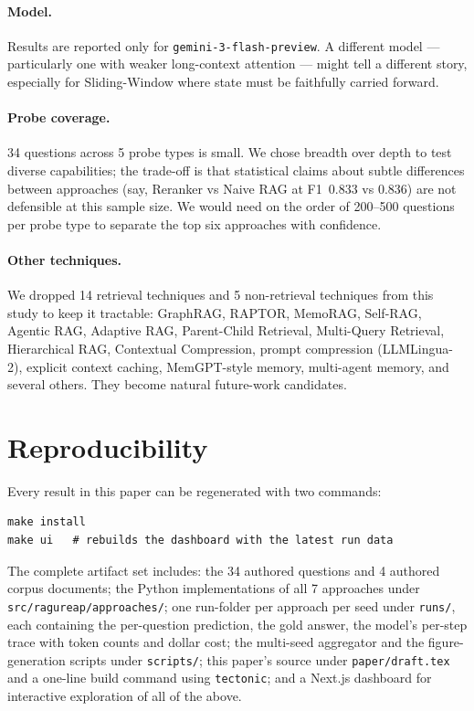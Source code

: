 \documentclass[11pt,a4paper]{article}
\begin{document}
\paragraph{Model.} Results are reported only for \texttt{gemini-3-flash-preview}. A different model — particularly one with weaker long-context attention — might tell a different story, especially for Sliding-Window where state must be faithfully carried forward.

\paragraph{Probe coverage.} 34 questions across 5 probe types is small. We chose breadth over depth to test diverse capabilities; the trade-off is that statistical claims about subtle differences between approaches (say, Reranker vs Naive RAG at F1~$0.833$ vs $0.836$) are not defensible at this sample size. We would need on the order of 200--500 questions per probe type to separate the top six approaches with confidence.

\paragraph{Other techniques.} We dropped 14 retrieval techniques and 5 non-retrieval techniques from this study to keep it tractable: GraphRAG, RAPTOR, MemoRAG, Self-RAG, Agentic RAG, Adaptive RAG, Parent-Child Retrieval, Multi-Query Retrieval, Hierarchical RAG, Contextual Compression, prompt compression (LLMLingua-2), explicit context caching, MemGPT-style memory, multi-agent memory, and several others. They become natural future-work candidates.

\section{Reproducibility}

Every result in this paper can be regenerated with two commands:

\begin{verbatim}
make install
make ui   # rebuilds the dashboard with the latest run data
\end{verbatim}

The complete artifact set includes: the 34 authored questions and 4 authored corpus documents; the Python implementations of all 7 approaches under \texttt{src/ragureap/approaches/}; one run-folder per approach per seed under \texttt{runs/}, each containing the per-question prediction, the gold answer, the model's per-step trace with token counts and dollar cost; the multi-seed aggregator and the figure-generation scripts under \texttt{scripts/}; this paper's source under \texttt{paper/draft.tex} and a one-line build command using \texttt{tectonic}; and a Next.js dashboard for interactive exploration of all of the above.
\end{document}
